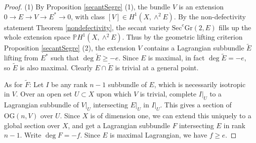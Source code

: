 \documentclass[10pt]{amsart}
\numberwithin{equation}{section}
\newcommand{\pp}{\mathbb P}
\newcommand{\Sec}{\mathrm{Sec}}
\newcommand{\Gr}{\mathrm{Gr}}
\newcommand{\OG}{\mathrm{OG}}
\begin{document}
\begin{proof}
(1) By Proposition \ref{secantSegre} (1), the bundle $V$ is an extension $0 \to E \to V \to E^* \to 0$, with class $[V] \in H^1 (X, \wedge^2 E)$. By the non-defectivity statement Theorem \ref{nondefectivity}, the secant variety $\Sec^e \Gr(2,E)$ fills up the whole extension space $\pp H^1 (X, \wedge^2 E)$.
 Thus by the geometric lifting criterion Proposition \ref{secantSegre} (2), the extension $V$ contains a Lagrangian subbundle $\widetilde{E}$ lifting from $E^*$ such that $\deg \widetilde{E} \ge -e$.
 Since $E$ is maximal, in fact $\deg \widetilde{E} = -e$, so $\widetilde{E}$ is also maximal. Clearly $E \cap \widetilde{E}$ is trivial at a general point.

As for $\widetilde{F}$: Let $I$ be any rank $n-1$ subbundle of $E$, which is necessarily isotropic in $V$. Over an open set $U \subset X$ upon which $V$ is trivial, complete $I|_U$ to a Lagrangian subbundle of $V|_U$ intersecting $E|_U$ in $I|_U$. This gives a section of $\OG(n,V)$ over $U$. Since $X$ is of dimension one, we can extend this uniquely to a global section over $X$, and get a Lagrangian subbundle $F$ intersecting $E$ in rank $n-1$. Write $\deg F = -f$. Since $E$ is maximal Lagrangian, we have $f \ge e$.


\end{proof}
\end{document}
